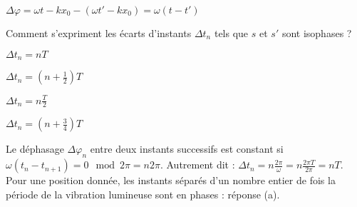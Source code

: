 	
	\begin{corrige}
		$\Delta \varphi = \omega t - k x_0 - \left( \omega t' - k x_0 \right) = \omega \left(t-t'\right)$
	\end{corrige}
	


\begin{enonce}
	Comment s'expriment les écarts d'instants $\Delta t_n$ tels que $s$ et $s'$ sont isophases ? 
	\begin{listeQCM2Colonnes}
	\item $\Delta t_n = n T$
	\item $\Delta t_n = \left(n+\frac{1}{2}\right) T$
	\item $\Delta t_n = n \frac{T}{2}$
	\item $\Delta t_n = \left(n+\frac{3}{4}\right) T$
	\end{listeQCM2Colonnes}

\end{enonce}

\reponse{\reponseA{}}

\begin{corrige}
	Le déphasage $\Delta \varphi_n$ entre deux instants successifs est constant si $\omega \left(t_n-t_{n+1}\right)= 0 \mod 2\pi = n 2\pi$. Autrement dit : $\Delta t_n = n\frac{2\pi}{\omega}= n\frac{2\pi T}{2\pi}= n T$. Pour une position donnée, les instants séparés d'un nombre entier de fois la période de la vibration lumineuse sont en phases : réponse (a).
\end{corrige}


\finEntrainement



